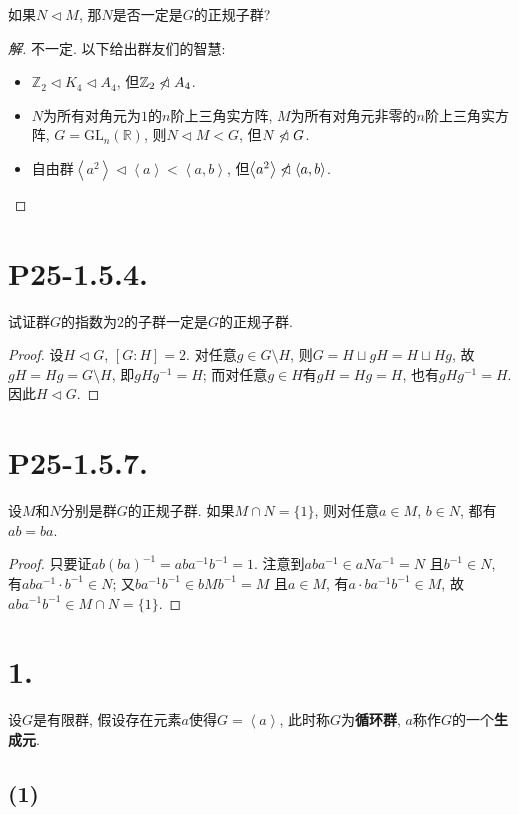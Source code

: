\documentclass[12pt, a4paper, fontset=windows]{ctexart}
\newcommand{\R}{\mathbb{R}}
\newcommand{\Z}{\mathbb{Z}}
\newcommand{\gen}[1]{\left\langle{#1}\right\rangle}
\newcommand{\nlhd}{\centernot{\lhd}}
\newenvironment{solution}{\begin{proof}[解]}{\end{proof}}
\begin{document}
如果$N\lhd M$, 那$N$是否一定是$G$的正规子群? 

\begin{solution}
不一定. 以下给出群友们的智慧: 

\begin{itemize}[itemsep=0em]
    \item $\Z_2\lhd K_4\lhd A_4$, 但$\Z_2\nlhd A_4$. 
    \item $N$为所有对角元为$1$的$n$阶上三角实方阵, $M$为所有对角元非零的$n$阶上三角实方阵, $G=\text{GL}_n(\R)$, 则$N\lhd M<G$, 但$N\nlhd G$. 
    \item 自由群$\gen{a^2}\lhd\gen{a}<\gen{a,b}$, 但$\gen{a^2}\nlhd\gen{a,b}$. 
\end{itemize}
\end{solution}

\section*{P25-1.5.4.}

试证群$G$的指数为$2$的子群一定是$G$的正规子群. 

\begin{proof}
设$H\lhd G$, $[G:H]=2$. 对任意$g\in G\setminus H$, 则$G=H\sqcup gH=H\sqcup Hg$, 
故$gH=Hg=G\setminus H$, 即$gHg^{-1}=H$; 而对任意$g\in H$有$gH=Hg=H$, 也有$gHg^{-1}=H$. 
因此$H\lhd G$. 
\end{proof}

\section*{P25-1.5.7.}

设$M$和$N$分别是群$G$的正规子群. 如果$M\cap N=\{1\}$, 
则对任意$a\in M$, $b\in N$, 都有$ab=ba$. 

\begin{proof}
只要证$ab(ba)^{-1}=aba^{-1}b^{-1}=1$. 注意到$aba^{-1}\in aNa^{-1}=N$
且$b^{-1}\in N$, 有$aba^{-1}\cdot b^{-1}\in N$; 又$ba^{-1}b^{-1}\in bMb^{-1}=M$
且$a\in M$, 有$a\cdot ba^{-1}b^{-1}\in M$, 故$aba^{-1}b^{-1}\in M\cap N=\{1\}$. 
\end{proof}

\section*{1.}

设$G$是有限群, 假设存在元素$a$使得$G=\gen{a}$, 
此时称$G$为{\bf 循环群}, $a$称作$G$的一个{\bf 生成元}. 

\subsection*{(1)}
\end{document}
